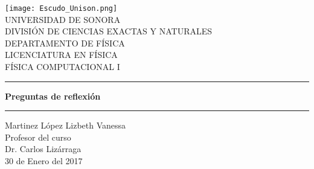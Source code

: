 \documentclass{article}
\begin{document}
\begin{center}
\texttt{[image: Escudo\_Unison.png]}
\\
\vspace{0.5cm}
UNIVERSIDAD DE SONORA \\
\vspace{0.5cm}
DIVISIÓN DE CIENCIAS EXACTAS Y NATURALES \\
\vspace{0.5cm}
DEPARTAMENTO DE FÍSICA\\
\vspace{0.5cm}
LICENCIATURA EN FÍSICA\\
\vspace{0.5cm}
FÍSICA COMPUTACIONAL I

\vspace{2 cm}
\hrule
\vspace{1 cm}

{\huge \bfseries {Preguntas de reflexión}}
\\

\vspace{1 cm}
\hrule
\vspace{2 cm}
Martinez López Lizbeth Vanessa \\ 
\vspace{1 cm}
Profesor del curso\\
Dr. Carlos Lizárraga\\
\vspace{2 cm}
30 de Enero del 2017
\end{center}
\pagebreak
\end{document}

